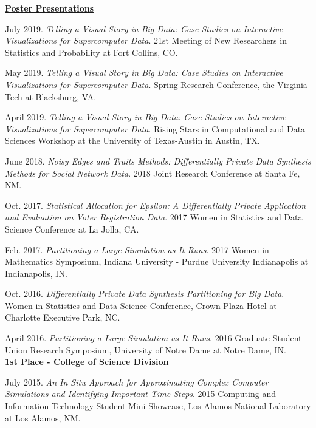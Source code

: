 \documentclass[11pt, letterpaper, roman]{moderncv} %
\begin{document}
\begin{etaremune}[topsep=0pt, itemsep=6pt, partopsep=0pt, parsep=0pt]
\newpage

\hspace{-0.30in}\underline{\textbf{\large Poster Presentations}}\normalsize
  \item July 2019. \textit{Telling a Visual Story in Big Data: Case Studies on Interactive Visualizations for Supercomputer Data}. 21st Meeting of New Researchers in Statistics and Probability at Fort Collins, CO.

  \item May 2019. \textit{Telling a Visual Story in Big Data: Case Studies on Interactive Visualizations for Supercomputer Data}. Spring Research Conference, the Virginia Tech at Blacksburg, VA.

  \item April 2019. \textit{Telling a Visual Story in Big Data: Case Studies on Interactive Visualizations for Supercomputer Data}. Rising Stars in Computational and Data Sciences Workshop at the University of Texas-Austin in Austin, TX.
  
  \item June 2018. \textit{Noisy Edges and Traits Methods: Differentially Private Data Synthesis Methods for Social Network Data}. 2018 Joint Research Conference at Santa Fe, NM.
  
  \item Oct. 2017. \textit{Statistical Allocation for Epsilon: A Differentially Private Application and Evaluation on Voter Registration Data}. 2017 Women in Statistics and Data Science Conference at La Jolla, CA.
  
  \item Feb. 2017. \textit{Partitioning a Large Simulation as It Runs}. 2017 Women in Mathematics Symposium, Indiana University - Purdue University Indianapolis at Indianapolis, IN.

  \item Oct. 2016. \textit{Differentially Private Data Synthesis Partitioning for Big Data}. Women in Statistics and Data Science Conference, Crown Plaza Hotel at Charlotte Executive Park, NC. 

  \item April 2016. \textit{Partitioning a Large Simulation as It Runs}. 2016 Graduate Student Union Research Symposium, University of Notre Dame at Notre Dame, IN.\\
  \textbf{1st Place - College of Science Division}

  \item July 2015. \textit{An In Situ Approach for Approximating Complex Computer Simulations and Identifying Important Time Steps}. 2015 Computing and Information Technology Student Mini Showcase, Los Alamos National Laboratory at Los Alamos, NM.


\end{etaremune}
\end{document}
